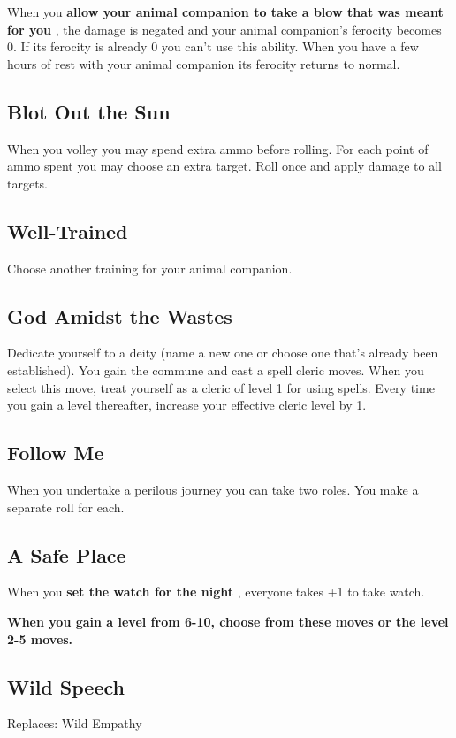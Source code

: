 When you \textbf{allow your animal companion to take a blow that was meant for you}
, the damage is negated and your animal companion's ferocity becomes 0. If its ferocity is already 0 you can't use this ability. When you have a few hours of rest with your animal companion its ferocity returns to normal.
\subsection{Blot Out the Sun}

When you volley you may spend extra ammo before rolling. For each point of ammo spent you may choose an extra target. Roll once and apply damage to all targets.
\subsection{Well-Trained}

Choose another training for your animal companion.
\subsection{God Amidst the Wastes}

Dedicate yourself to a deity (name a new one or choose one that's already been established). You gain the commune and cast a spell cleric moves. When you select this move, treat yourself as a cleric of level 1 for using spells. Every time you gain a level thereafter, increase your effective cleric level by 1.
\subsection{Follow Me}

When you undertake a perilous journey you can take two roles. You make a separate roll for each.
\subsection{A Safe Place}

When you \textbf{set the watch for the night}
, everyone takes +1 to take watch.

\vspace{\baselineskip}
{\bfseries When you gain a level from 6-10, choose from these moves or the level 2-5 moves.}
\subsection{Wild Speech}

Replaces: Wild Empathy

